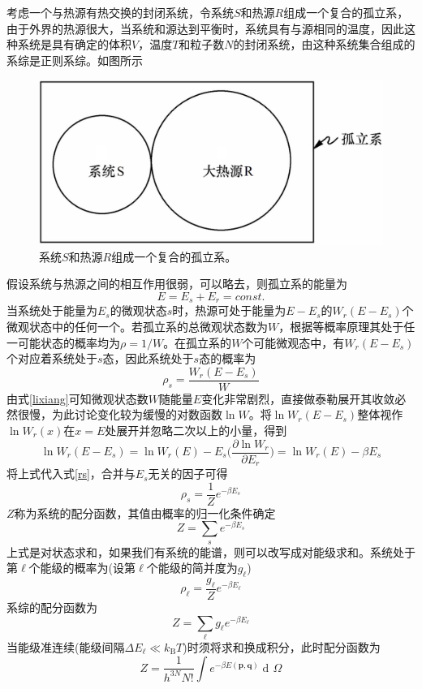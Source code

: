 \documentclass[UTF8,oneside,openany]{ctexbook}
\DeclareMathOperator\dif{d\!}
\newcommand\kb{k_{\text{B}}}
\begin{document}
考虑一个与热源有热交换的封闭系统，令系统$S$和热源$R$组成一个复合的孤立系，由于外界的热源很大，当系统和源达到平衡时，系统具有与源相同的温度，因此这种系统是具有确定的体积$V$，温度$T$和粒子数$N$的封闭系统，由这种系统集合组成的系综是正则系综。如图所示
\begin{figure}[ht]
	\centering
	\includegraphics[scale=0.2]{ce.png}
	\caption{系统$S$和热源$R$组成一个复合的孤立系。}
\end{figure}

假设系统与热源之间的相互作用很弱，可以略去，则孤立系的能量为
\begin{equation}
E=E_s+E_r=const.
\end{equation}
当系统处于能量为$E_s$的微观状态$s$时，热源可处于能量为$E-E_s$的$W_r(E-E_s)$个微观状态中的任何一个。若孤立系的总微观状态数为$W$，根据等概率原理其处于任一可能状态的概率均为$\rho=1/W$。在孤立系的$W$个可能微观态中，有$W_r(E-E_s)$个对应着系统处于$s$态，因此系统处于$s$态的概率为
\begin{equation}\label{rs}
\rho_s=\frac{W_r(E-E_s)}{W}
\end{equation}
由式\ref{lixiang}可知微观状态数$W$随能量$E$变化非常剧烈，直接做泰勒展开其收敛必然很慢，为此讨论变化较为缓慢的对数函数$\ln W$。将$\ln W_r(E-E_s)$整体视作$\ln W_r(x)$在$x=E$处展开并忽略二次以上的小量，得到
\begin{equation}
\ln W_r(E-E_s)=\ln W_r(E)-E_s\biggl(\frac{\partial\ln W_r}{\partial E_r}\biggr)=\ln W_r(E)-\beta E_s
\end{equation}
将上式代入式\ref{rs}，合并与$E_s$无关的因子可得
\begin{equation}\label{ps}
\rho_s=\frac1Z e^{-\beta E_s}
\end{equation}
$Z$称为系统的配分函数，其值由概率的归一化条件确定
\begin{equation}
Z=\sum_{s}e^{-\beta E_s}
\end{equation}
上式是对状态求和，如果我们有系统的能谱，则可以改写成对能级求和。系统处于第$\ell$个能级的概率为(设第$\ell$个能级的简并度为$g_{\ell}$)
\begin{equation}
\rho_{\ell}=\frac{g_{\ell}}{Z}e^{-\beta E_{\ell}}
\end{equation}
系综的配分函数为
\begin{equation}
Z=\sum_{\ell}g_{\ell}e^{-\beta E_{\ell}}
\end{equation}
当能级准连续(能级间隔$\Delta E_{\ell}\ll\kb T$)时须将求和换成积分，此时配分函数为
\begin{equation}
Z=\frac{1}{h^{3N}N!}\int e^{-\beta E(\pmb{p},\pmb{q})}\dif\Omega
\end{equation}
\end{document}

